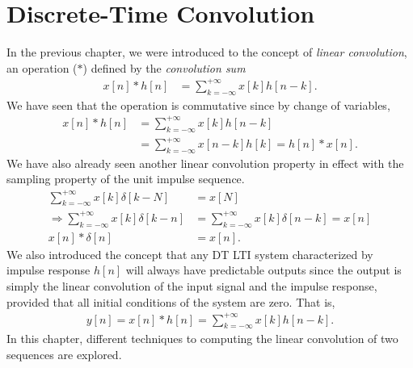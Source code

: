 \documentclass{report}
\begin{document}
\setcounter{chapter}{2}
\setcounter{page}{19}
\chapter{Discrete-Time Convolution}

In the previous chapter, we were introduced to the concept of \emph{linear convolution}, an operation ($*$) defined by the \emph{convolution sum}
\begin{align*}
    x[n] * h[n] &= \sum_{k=-\infty}^{+\infty} x[k]h[n-k].
\end{align*}
We have seen that the operation is commutative since by change of variables, 
\begin{align*}
    x[n] * h[n] &= \sum_{k=-\infty}^{+\infty} x[k]h[n-k] \\
    &= \sum_{k=-\infty}^{+\infty} x[n-k]h[k] = h[n] * x[n].
\end{align*}
We have also already seen another linear convolution property in effect with the sampling property of the unit impulse sequence. 
\begin{align*}
    \sum_{k=-\infty}^{+\infty} x[k]\delta[k-N] &= x[N] \\
    \Longrightarrow \sum_{k=-\infty}^{+\infty} x[k]\delta[k-n] &= \sum_{k=-\infty}^{+\infty} x[k]\delta[n-k] = x[n] \\
    x[n] * \delta[n] &= x[n].
\end{align*}
We also introduced the concept that any DT LTI system characterized by impulse response $h[n]$ will always have predictable outputs since the output is simply the 
linear convolution of the input signal and the impulse response, provided that all initial conditions of the system are zero. That is, 
\begin{align}
    y[n] = x[n] * h[n] = \sum_{k=-\infty}^{+\infty} x[k]h[n-k].
\end{align}
In this chapter, different techniques to computing the linear convolution of two sequences are explored.
\end{document}
